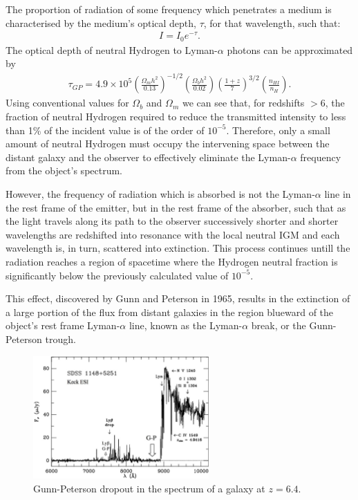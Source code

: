 		The proportion of radiation of some frequency which penetrates a medium is characterised by the medium's optical depth, $\tau$, for that wavelength, such that:
		\begin{align}
			I = I_0 e^{-\tau}.
		\end{align}
		The optical depth of neutral Hydrogen to Lyman-$\alpha$ photons can be approximated by
		\begin{align}
			\tau_{GP} = 4.9 \times 10^5	\left ( 	\frac{\Omega_m h^2}{0.13}	\right ) ^{-1/2}
										\left ( 	\frac{\Omega_b h^2}{0.02}	\right )
										\left ( 	\frac{1+z}{7}			\right )^{3/2}
										\left ( 	\frac{n_{HI}}{n_H}			\right ) .
		\end{align}		%
		Using conventional values for $\Omega_b$ and $\Omega_m$ we can see that, for redshifts $>6$, the fraction of neutral Hydrogen required to reduce the transmitted intensity to less than 1\% of the incident value is of the order of $10^{-5}$. Therefore, only a small amount of neutral Hydrogen must occupy the intervening space between the distant galaxy and the observer to effectively eliminate the Lyman-$\alpha$ frequency from the object's spectrum.

		However, the frequency of radiation which is absorbed is not the Lyman-$\alpha$ line in the rest frame of the emitter, but in the rest frame of the absorber, such that as the light travels along its path to the observer successively shorter and shorter wavelengths are redshifted into resonance with the local neutral IGM and each wavelength is, in turn, scattered into extinction. This process continues untill the radiation reaches a region of spacetime where the Hydrogen neutral fraction is significantly below the previously calculated value of $10^{-5}$.

		This effect, discovered by Gunn and Peterson in 1965, results in the extinction of a large portion of the flux from distant galaxies in the region blueward of the object's rest frame  Lyman-$\alpha$ line, known as the Lyman-$\alpha$ break, or the Gunn-Peterson trough.
		\begin{figure}[htbp]
			\centering
			\includegraphics[width=0.6\textwidth]{../Images/dropout.jpg}
			\caption{Gunn-Peterson dropout in the spectrum of a galaxy at $z=6.4$.}\label{fig:dropout}
		\end{figure}%

